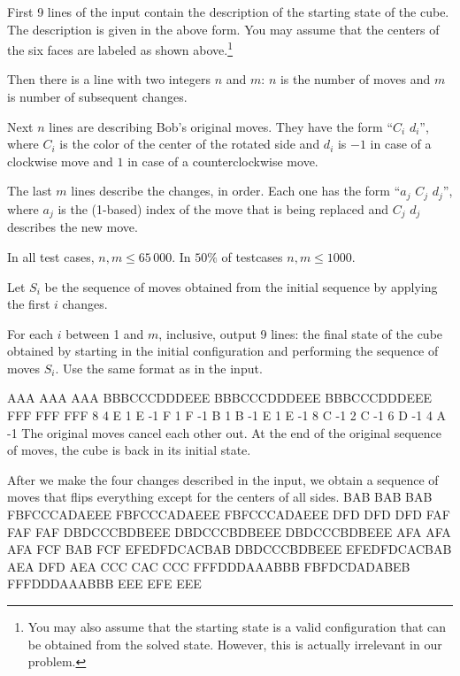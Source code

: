 
First 9 lines of the input contain the description of
the starting state of the cube. The description is given
in the above form. You may assume that the centers of the
six faces are labeled as shown above.\footnote{You may also assume
that the starting state is a valid configuration that can be obtained
from the solved state. However, this is actually irrelevant in our problem.}

Then there is a line with two integers $n$ and $m$:
$n$ is the number of moves and $m$ is number of subsequent changes.

Next $n$ lines are describing Bob's original moves.
They have the form ``$C_i$ $d_i$'',
where $C_i$ is the color of the center of the rotated side
and $d_i$ is $-1$ in case of a clockwise move
and $1$ in case of a counterclockwise move.

The last $m$ lines describe the changes, in order.
Each one has the form ``$a_j$ $C_j$ $d_j$'',
where $a_j$ is the (1-based) index of the move that
is being replaced and $C_j$ $d_j$ describes the
new move.


In all test cases, $n,m \leq 65\,000$. In $50\%$ of testcases $n,m \leq 1000$.

\newpage


Let $S_i$ be the sequence of moves obtained from the initial sequence
by applying the first $i$ changes.

For each $i$ between 1 and $m$, inclusive, output 9 lines: the final state
of the cube obtained by starting in the initial configuration and performing
the sequence of moves $S_i$. Use the same format as in the input.


\sampleIN
AAA
AAA
AAA
BBBCCCDDDEEE
BBBCCCDDDEEE
BBBCCCDDDEEE
FFF
FFF
FFF
8 4
E 1
E -1
F 1
F -1
B 1
B -1
E 1
E -1
8 C -1
2 C -1
6 D -1
4 A -1
\sampleCOMMENT
The original moves cancel each other out.
At the end of the original sequence of moves,
the cube is back in its initial state.

After we make the four changes described in the input,
we obtain a sequence of moves that flips everything
except for the centers of all sides.
\sampleOUT
BAB
BAB
BAB
FBFCCCADAEEE
FBFCCCADAEEE
FBFCCCADAEEE
DFD
DFD
DFD
FAF
FAF
FAF
DBDCCCBDBEEE
DBDCCCBDBEEE
DBDCCCBDBEEE
AFA
AFA
AFA
FCF
BAB
FCF
EFEDFDCACBAB
DBDCCCBDBEEE
EFEDFDCACBAB
AEA
DFD
AEA
CCC
CAC
CCC
FFFDDDAAABBB
FBFDCDADABEB
FFFDDDAAABBB
EEE
EFE
EEE
\sampleEND


